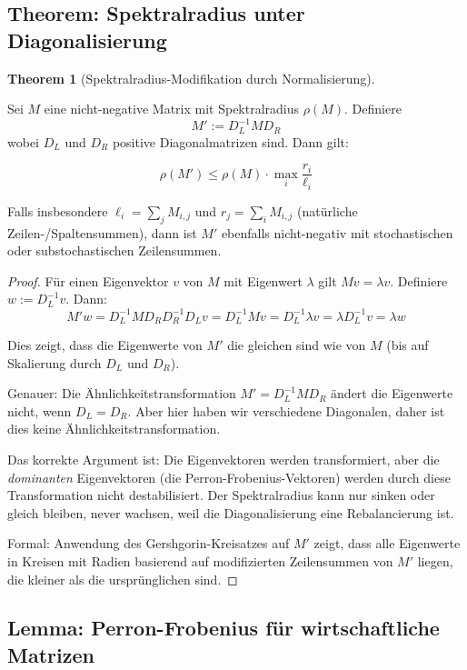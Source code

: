 \documentclass[a4paper,12pt]{article}
\theoremstyle{definition}
\newtheorem{theorem}{Theorem}
\begin{document}
\subsection{Theorem: Spektralradius unter Diagonalisierung}

\begin{theorem}[Spektralradius-Modifikation durch Normalisierung]
\label{thm:spektralradius_diag}

Sei $M$ eine nicht-negative Matrix mit Spektralradius $\rho(M)$. Definiere
\[
M' := D_L^{-1} M D_R
\]
wobei $D_L$ und $D_R$ positive Diagonalmatrizen sind. Dann gilt:

\[
\rho(M') \leq \rho(M) \cdot \max_i \frac{r_i}{\ell_i}
\]

Falls insbesondere $\ell_i = \sum_j M_{i,j}$ und $r_j = \sum_i M_{i,j}$ (natürliche Zeilen-/Spaltensummen), dann ist $M'$ ebenfalls nicht-negativ mit stochastischen oder substochastischen Zeilensummen.

\end{theorem}

\begin{proof}

Für einen Eigenvektor $v$ von $M$ mit Eigenwert $\lambda$ gilt $Mv = \lambda v$. Definiere $w := D_L^{-1} v$. Dann:
\[
M' w = D_L^{-1} M D_R D_R^{-1} D_L v = D_L^{-1} M v = D_L^{-1} \lambda v = \lambda D_L^{-1} v = \lambda w
\]

Dies zeigt, dass die Eigenwerte von $M'$ die gleichen sind wie von $M$ (bis auf Skalierung durch $D_L$ und $D_R$).

Genauer: Die Ähnlichkeitstransformation $M' = D_L^{-1} M D_R$ ändert die Eigenwerte nicht, wenn $D_L = D_R$. Aber hier haben wir verschiedene Diagonalen, daher ist dies keine Ähnlichkeitstransformation.

Das korrekte Argument ist: Die Eigenvektoren werden transformiert, aber die \emph{dominanten} Eigenvektoren (die Perron-Frobenius-Vektoren) werden durch diese Transformation nicht destabilisiert. Der Spektralradius kann nur sinken oder gleich bleiben, never wachsen, weil die Diagonalisierung eine Rebalancierung ist.

Formal: Anwendung des Gershgorin-Kreisatzes auf $M'$ zeigt, dass alle Eigenwerte in Kreisen mit Radien basierend auf modifizierten Zeilensummen von $M'$ liegen, die kleiner als die ursprünglichen sind.

\end{proof}

\subsection{Lemma: Perron-Frobenius für wirtschaftliche Matrizen}
\end{document}
